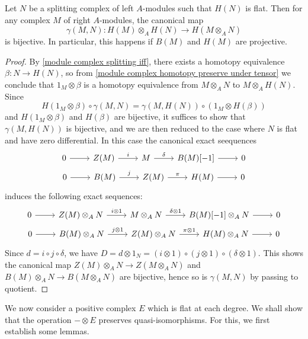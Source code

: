 \begin{corollary}\label{module complex splitting homology exact tensor preserve homology}
Let $N$ be a splitting complex of left $A$-modules such that $H(N)$ is flat. Then for any complex $M$ of right $A$-modules, the canonical map
\[\gamma(M,N):H(M)\otimes_AH(N)\to H(M\otimes_AN)\]
is bijective. In particular, this happens if $B(M)$ and $H(M)$ are projective.
\end{corollary}
\begin{proof}
By \cref{module complex splitting iff}, there exists a homotopy equivalence $\beta:N\to H(N)$, so from \cref{module complex homotopy preserve under tensor} we conclude that $1_M\otimes\beta$ is a homotopy equivalence from $M\otimes_AN$ to $M\otimes_AH(N)$. Since
\[H(1_M\otimes\beta)\circ\gamma(M,N)=\gamma(M,H(N))\circ(1_M\otimes H(\beta))\]
and $H(1_M\otimes\beta)$ and $H(\beta)$ are bijective, it suffices to show that $\gamma(M,H(N))$ is bijective, and we are then reduced to the case where $N$ is flat and have zero differential. In this case the canonical exact seequences
\[\begin{gathered}
\begin{tikzcd}
0\ar[r]&Z(M)\ar[r,"i"]&M\ar[r,"\delta"]&B(M)[-1]\ar[r]&0
\end{tikzcd}\\
\begin{tikzcd}
0\ar[r]&B(M)\ar[r,"j"]&Z(M)\ar[r,"\pi"]&H(M)\ar[r]&0
\end{tikzcd}
\end{gathered}\]
induces the following exact sequences:
\[\begin{gathered}
\begin{tikzcd}
0\ar[r]&Z(M)\otimes_AN\ar[r,"i\otimes 1"]&M\otimes_AN\ar[r,"\delta\otimes 1"]&B(M)[-1]\otimes_AN\ar[r]&0
\end{tikzcd}\\
\begin{tikzcd}
0\ar[r]&B(M)\otimes_AN\ar[r,"j\otimes 1"]&Z(M)\otimes_AN\ar[r,"\pi\otimes 1"]&H(M)\otimes_AN\ar[r]&0
\end{tikzcd}
\end{gathered}\]
Since $d=i\circ j\circ\delta$, we have $D=d\otimes 1_N=(i\otimes 1)\circ(j\otimes 1)\circ(\delta\otimes 1)$. This shows the canonical map $Z(M)\otimes_AN\to Z(M\otimes_AN)$ and $B(M)\otimes_AN\to B(M\otimes_AN)$ are bijective, hence so is $\gamma(M,N)$ by passing to quotient.
\end{proof}
We now consider a positive complex $E$ which is flat at each degree. We shall show that the operation $-\otimes E$ preserves quasi-isomorphisms. For this, we first establish some lemmas.
